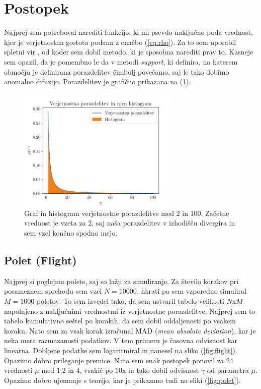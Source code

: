 \documentclass[12pt]{article}
\begin{document}
\newpage
\section*{Postopek}
Najprej sem potreboval narediti funkcijo, ki mi psevdo-naključno poda vrednost, kjer je verjetnostna gostota podana z enačbo (\ref{eq:rho}). Za to sem uporabil spletni vir {\cite{stackoverflow}}, od koder sem dobil metodo, ki je sposobna narediti prav to. Kasneje sem opazil, da je pomembno le da v metodi \textit{support}, ki definira, na katerem območju je definirana porazdelitev čimbolj povečamo, saj le tako dobimo anomalno difuzijo. Porazdelitev je grafično prikazana na (\ref{fig:verjetnost}).

\begin{figure}
    \centering
    \includegraphics[width=0.7\textwidth]{VerjetnostnaPorazdelitev.png}
    \caption{\label{fig:verjetnost} Graf in histogram verjetnostne porazdelitve med 2 in 100. Začetne vrednost je vzeta za 2, saj naša porazdelitev v izhodišču divergira in sem vzel končno spodno mejo.}
\end{figure}

\subsection*{Polet (Flight)}
Najprej si poglejmo polete, saj so lažji za simuliranje. Za število korakov pri posameznem sprehodu sem vzel $N = \num{10000}$, hkrati pa sem vzporedno simuliral $M = \num{1000}$ poletov. To sem izvedel tako, da sem ustvaril tabelo velikosti $N$x$M$ napolnjeno z naključnimi vrednostmi iz verjetnostne porazdelitve. Najprej sem to tabelo kumulativno seštel po korakih, da sem dobil oddaljenosti po vsakem koraku. Nato sem za vsak korak izračunal MAD (\textit{mean absolute deviation}), kar je neka mera razmazanosti podatkov. V tem primeru je časovna odvisnost kar linearna. Dobljene podatke sem logaritmiral in nanesel na sliko (\ref{fig:flight}). Opazimo dobro prileganje premice. Nato sem enak postopek ponovil za 24 vrednosti $\mu$ med $\num{1.2}$ in $4$, vsakič po $10$x in tako dobil odvisnost $\gamma$ od parametra $\mu$. Opazimo dobro ujemanje s teorijo, kar je prikazano tudi na sliki (\ref{fig:polet}).
\end{document}
